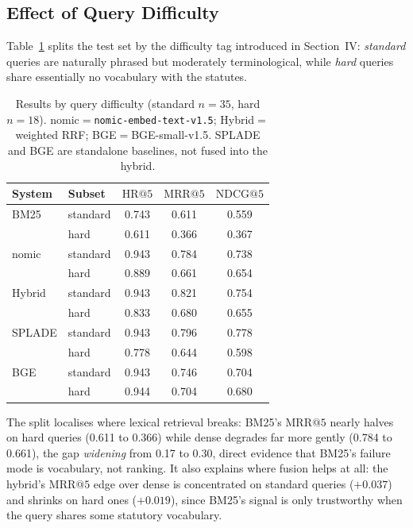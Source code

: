 \documentclass[conference,a4paper]{IEEEtran}
\makeatletter
\newcommand{\HR}[1]{\mathrm{HR}@{#1}}
\newcommand{\MRR}[1]{\mathrm{MRR}@{#1}}
\newcommand{\NDCG}[1]{\mathrm{NDCG}@{#1}}
\makeatother
\begin{document}
\subsection{Effect of Query Difficulty}

Table~\ref{tab:difficulty} splits the test set by the difficulty tag
introduced in Section~IV: \emph{standard} queries are naturally
phrased but moderately terminological, while \emph{hard} queries
share essentially no vocabulary with the statutes.

\begin{table}[!t]
\renewcommand{\arraystretch}{1.15}
\caption{Results by query difficulty (standard $n{=}35$,
  hard $n{=}18$). nomic${=}$\texttt{nomic-embed-text-v1.5};
  Hybrid${=}$weighted RRF; BGE${=}$BGE-small-v1.5. SPLADE and BGE are
  standalone baselines, not fused into the hybrid.}
\label{tab:difficulty}
\centering
\small
\setlength{\tabcolsep}{4.5pt}
\begin{tabular}{@{}llccc@{}}
\toprule
System & Subset & $\HR{5}$ & $\MRR{5}$ & $\NDCG{5}$ \\
\midrule
BM25   & standard & 0.743 & 0.611 & 0.559 \\
       & hard     & 0.611 & 0.366 & 0.367 \\
\midrule
nomic  & standard & 0.943 & 0.784 & 0.738 \\
       & hard     & 0.889 & 0.661 & 0.654 \\
\midrule
Hybrid & standard & 0.943 & 0.821 & 0.754 \\
       & hard     & 0.833 & 0.680 & 0.655 \\
\midrule
SPLADE & standard & 0.943 & 0.796 & 0.778 \\
       & hard     & 0.778 & 0.644 & 0.598 \\
\midrule
BGE    & standard & 0.943 & 0.746 & 0.704 \\
       & hard     & 0.944 & 0.704 & 0.680 \\
\bottomrule
\end{tabular}
\end{table}

The split localises where lexical retrieval breaks: BM25's
$\MRR{5}$ nearly halves on hard queries (0.611 to 0.366) while dense
degrades far more gently (0.784 to 0.661), the gap \emph{widening}
from 0.17 to 0.30, direct evidence that BM25's failure mode is
vocabulary, not ranking.
It also explains where fusion helps at all: the hybrid's $\MRR{5}$
edge over dense is concentrated on standard queries ($+0.037$) and
shrinks on hard ones ($+0.019$), since BM25's signal is only
trustworthy when the query shares some statutory vocabulary.
\end{document}
